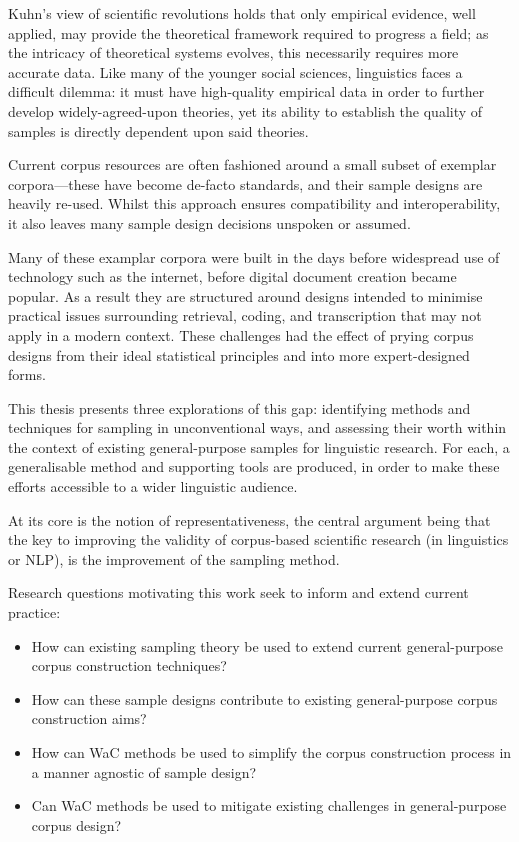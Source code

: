 

Kuhn's view of scientific revolutions\cite{kuhn1970structure}
holds that only empirical evidence, well applied, may provide the theoretical framework required to progress a field; as the intricacy of theoretical systems evolves, this necessarily requires more accurate data.  Like many of the younger social sciences, linguistics faces a difficult dilemma: it must have high-quality empirical data in order to further develop widely-agreed-upon theories, yet its ability to establish the quality of samples is directly dependent upon said theories.

Current corpus resources are often fashioned around a small subset of exemplar corpora---these have become de-facto standards, and their sample designs are heavily re-used.
Whilst this approach ensures compatibility and interoperability, it also leaves many sample design decisions unspoken or assumed.

Many of these examplar corpora were built in the days before widespread use of technology such as the internet, before digital document creation became popular.  As a result they are structured around designs intended to minimise practical issues surrounding retrieval, coding, and transcription that may not apply in a modern context.  These challenges had the effect of prying corpus designs from their ideal statistical principles and into more expert-designed forms\cite{atkins1992corpus}.

This thesis presents three explorations of this gap: identifying methods and techniques for sampling in unconventional ways, and assessing their worth within the context of existing general-purpose samples for linguistic research.  For each, a generalisable method and supporting tools are produced, in order to make these efforts accessible to a wider linguistic audience.

At its core is the notion of representativeness, the central argument being that the key to improving the validity of corpus-based scientific research (in linguistics or NLP), is the improvement of the sampling method.

Research questions motivating this work seek to inform and extend current practice:
\begin{itemize}
    \item How can existing sampling theory be used to extend current general-purpose corpus construction techniques?
    \item How can these sample designs contribute to existing general-purpose corpus construction aims?
    \item How can WaC methods be used to simplify the corpus construction process in a manner agnostic of sample design?
    \item Can WaC methods be used to mitigate existing challenges in general-purpose corpus design?
\end{itemize}



